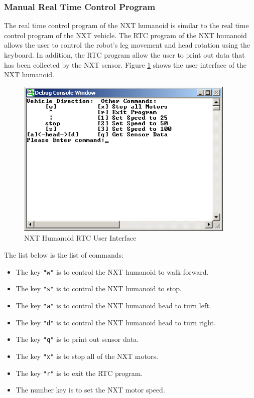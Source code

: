 \documentclass[11pt]{article}
\begin{document}
\newpage
\subsubsection{Manual Real Time Control Program}
The real time control program of the NXT humanoid is similar to the real time control program of the NXT vehicle.
The RTC program of the NXT humanoid allows the user to control the robot's leg movement and head rotation using the
keyboard. In addition, the RTC program allow the user to print out data that has been collected by the NXT sensor.
Figure \ref{fig_human_UI} shows the user interface of the NXT humanoid.

\begin{figure}[ht]
  \begin{center}
    \includegraphics[height=3in]{figure/mindstorm/human_UI.png}
    \caption{NXT Humanoid RTC User Interface \label{fig_human_UI}}
  \end{center}
\end{figure}

The list below is the list of commands:
\begin{itemize}
\item The key \verb+"w"+ is to control the NXT humanoid to walk forward.
\item The key \verb+"s"+ is to control the NXT humanoid to stop.
\item The key \verb+"a"+ is to control the NXT humanoid head to turn left.
\item The key \verb+"d"+ is to control the NXT humanoid head to turn right.
\item The key \verb+"q"+ is to print out sensor data.
\item The key \verb+"x"+ is to stop all of the NXT motors.
\item The key \verb+"r"+ is to exit the RTC program.
\item The number key is to set the NXT motor speed.
\end{itemize}
\end{document}
